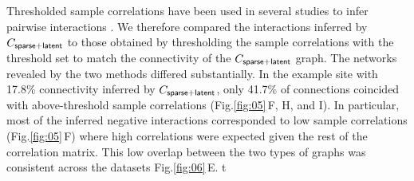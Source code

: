 \documentclass[10pt]{article}
\newcommand{\figref}[2]{Fig.\;\ref{fig:#1}\,#2}
\begin{document}
Thresholded sample correlations have been used in several studies to infer pairwise interactions \cite{Golshani:2009, Feldt:2011, Malmersjo:2013}.  We therefore compared the interactions inferred by $C_{\sf sparse+latent}$ to those obtained by thresholding the sample correlations with the threshold set to match the connectivity of the $C_{\sf sparse+latent}$ graph.  The networks revealed by the two methods differed substantially. In the example site with 17.8\% connectivity inferred by $C_{\sf sparse+latent}$, only 41.7\% of connections coincided with above-threshold sample correlations (\figref{05}{F, H, and I}). In particular, most of the inferred negative interactions corresponded to low sample correlations (\figref{05}{F}) where high correlations were expected given the rest of the correlation matrix.  This low overlap between the two types of graphs was consistent across the datasets \figref{06}{E}. 
t
\end{document}

